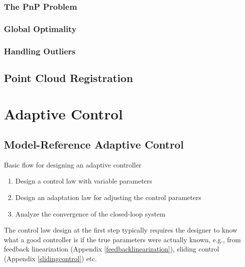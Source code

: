 \documentclass[
]{book}
\theoremstyle{definition}
\theoremstyle{definition}
\theoremstyle{definition}
\theoremstyle{definition}
\theoremstyle{remark}
\begin{document}
\hypertarget{the-pnp-problem}{%
\subsection{The PnP Problem}\label{the-pnp-problem}}

\hypertarget{global-optimality}{%
\subsection{Global Optimality}\label{global-optimality}}

\hypertarget{handling-outliers}{%
\subsection{Handling Outliers}\label{handling-outliers}}

\hypertarget{point-cloud-registration}{%
\section{Point Cloud Registration}\label{point-cloud-registration}}

\hypertarget{adaptivecontrol}{%
\chapter{Adaptive Control}\label{adaptivecontrol}}

\hypertarget{model-reference-adaptive-control}{%
\section{Model-Reference Adaptive Control}\label{model-reference-adaptive-control}}

Basic flow for designing an adaptive controller

\begin{enumerate}
\def\labelenumi{\arabic{enumi}.}
\item
  Design a control law with variable parameters
\item
  Design an adaptation law for adjusting the control parameters
\item
  Analyze the convergence of the closed-loop system
\end{enumerate}

The control law design at the first step typically requires the designer to know what a good controller is if the true parameters were actually known, e.g., from feedback linearization (Appendix \ref{feedbacklinearization}), sliding control (Appendix \ref{slidingcontrol}) etc.
\end{document}
